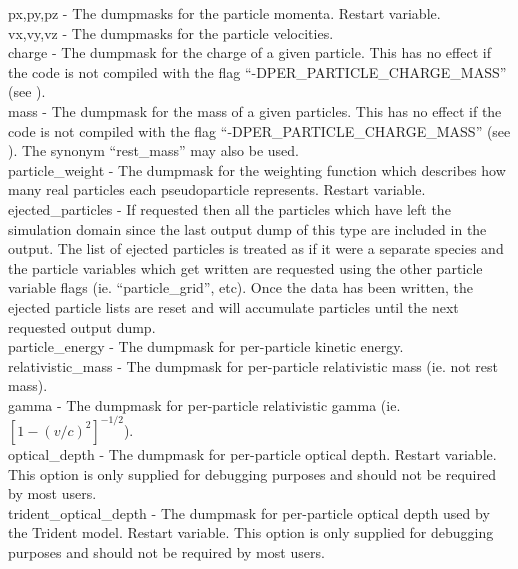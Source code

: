 {\emphtext px,\;py,\;pz} - The dumpmasks for the particle momenta. Restart
variable.\\

{\emphtext vx,\;vy,\;vz} - The dumpmasks for the particle velocities.\\

{\emphtext charge} - The dumpmask for the charge of a given particle. This
has no effect if the code is not compiled with the flag
``-DPER\_PARTICLE\_CHARGE\_MASS'' (see ).\\

{\emphtext mass} - The dumpmask for the mass of a given particles. This
has no effect if the code is not compiled with the flag
``-DPER\_PARTICLE\_CHARGE\_MASS'' (see ).
The synonym ``rest\_mass'' may also be used.\\

{\emphtext particle\_weight} - The dumpmask for the weighting function which
describes how many real particles each pseudoparticle represents. Restart
variable.\\

{\emphtext ejected\_particles} - If requested then all the particles which
  have left the simulation domain since the last output dump of this type are
  included in the output. The list of ejected particles is treated as if
  it were a separate species and the particle variables which get written
  are requested using the other particle variable flags (ie. ``particle\_grid'',
  etc). Once the data has been written, the ejected particle lists are
  reset and will accumulate particles until the next requested output dump.\\

{\emphtext particle\_energy} - The dumpmask for per-particle kinetic energy.\\

{\emphtext relativistic\_mass} - The dumpmask for per-particle relativistic
mass (ie. not rest mass).\\

{\emphtext gamma} - The dumpmask for per-particle relativistic gamma
(ie. $[1-(v/c)^2]^{-1/2}$).\\

{\emphtext optical\_depth} - The dumpmask for per-particle optical depth.
  Restart variable. This option is only supplied for debugging purposes and
  should not be required by most users.\\

{\emphtext trident\_optical\_depth} - The dumpmask for per-particle optical
  depth used by the Trident model.
  Restart variable. This option is only supplied for debugging purposes and
  should not be required by most users.\\

